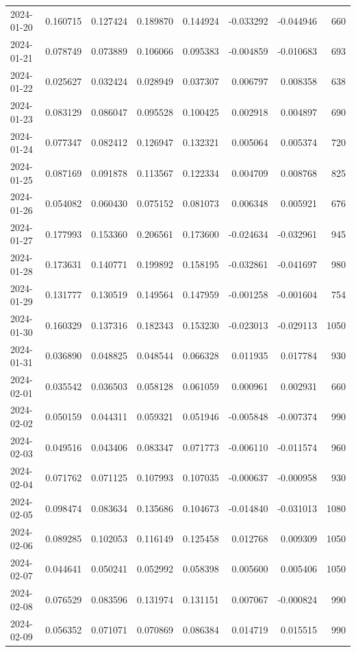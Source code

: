 \begin{tabular}{lrrrrrrr}
2024-01-20 & 0.160715 & 0.127424 & 0.189870 & 0.144924 & -0.033292 & -0.044946 & 660 \\
2024-01-21 & 0.078749 & 0.073889 & 0.106066 & 0.095383 & -0.004859 & -0.010683 & 693 \\
2024-01-22 & 0.025627 & 0.032424 & 0.028949 & 0.037307 & 0.006797 & 0.008358 & 638 \\
2024-01-23 & 0.083129 & 0.086047 & 0.095528 & 0.100425 & 0.002918 & 0.004897 & 690 \\
2024-01-24 & 0.077347 & 0.082412 & 0.126947 & 0.132321 & 0.005064 & 0.005374 & 720 \\
2024-01-25 & 0.087169 & 0.091878 & 0.113567 & 0.122334 & 0.004709 & 0.008768 & 825 \\
2024-01-26 & 0.054082 & 0.060430 & 0.075152 & 0.081073 & 0.006348 & 0.005921 & 676 \\
2024-01-27 & 0.177993 & 0.153360 & 0.206561 & 0.173600 & -0.024634 & -0.032961 & 945 \\
2024-01-28 & 0.173631 & 0.140771 & 0.199892 & 0.158195 & -0.032861 & -0.041697 & 980 \\
2024-01-29 & 0.131777 & 0.130519 & 0.149564 & 0.147959 & -0.001258 & -0.001604 & 754 \\
2024-01-30 & 0.160329 & 0.137316 & 0.182343 & 0.153230 & -0.023013 & -0.029113 & 1050 \\
2024-01-31 & 0.036890 & 0.048825 & 0.048544 & 0.066328 & 0.011935 & 0.017784 & 930 \\
2024-02-01 & 0.035542 & 0.036503 & 0.058128 & 0.061059 & 0.000961 & 0.002931 & 660 \\
2024-02-02 & 0.050159 & 0.044311 & 0.059321 & 0.051946 & -0.005848 & -0.007374 & 990 \\
2024-02-03 & 0.049516 & 0.043406 & 0.083347 & 0.071773 & -0.006110 & -0.011574 & 960 \\
2024-02-04 & 0.071762 & 0.071125 & 0.107993 & 0.107035 & -0.000637 & -0.000958 & 930 \\
2024-02-05 & 0.098474 & 0.083634 & 0.135686 & 0.104673 & -0.014840 & -0.031013 & 1080 \\
2024-02-06 & 0.089285 & 0.102053 & 0.116149 & 0.125458 & 0.012768 & 0.009309 & 1050 \\
2024-02-07 & 0.044641 & 0.050241 & 0.052992 & 0.058398 & 0.005600 & 0.005406 & 1050 \\
2024-02-08 & 0.076529 & 0.083596 & 0.131974 & 0.131151 & 0.007067 & -0.000824 & 990 \\
2024-02-09 & 0.056352 & 0.071071 & 0.070869 & 0.086384 & 0.014719 & 0.015515 & 990 \\

\end{tabular}
